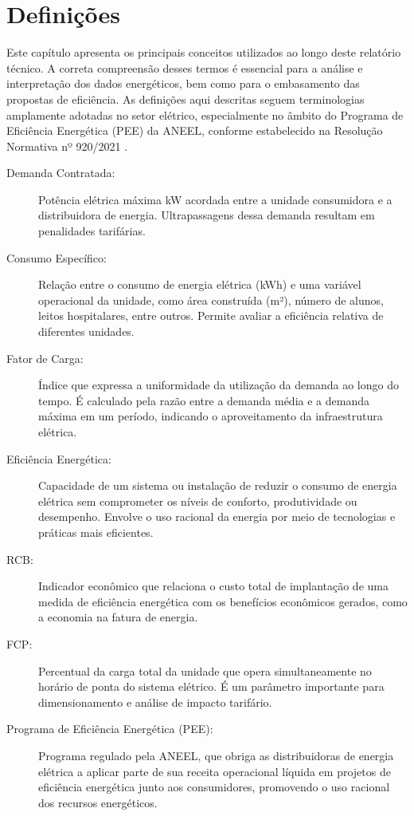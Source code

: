 \chapter{Definições}


Este capítulo apresenta os principais conceitos utilizados ao longo deste relatório técnico. A correta compreensão desses termos é essencial para a análise e interpretação dos dados energéticos, bem como para o embasamento das propostas de eficiência. As definições aqui descritas seguem terminologias amplamente adotadas no setor elétrico, especialmente no âmbito do Programa de Eficiência Energética (\ac{PEE}) da \ac{ANEEL}, conforme estabelecido na Resolução Normativa nº 920/2021 \cite{aneel920}.


\begin{description}
    \item[Demanda Contratada:] Potência elétrica máxima kW  acordada entre a unidade consumidora e a distribuidora de energia. Ultrapassagens dessa demanda resultam em penalidades tarifárias.
    
    \item[Consumo Específico:] Relação entre o consumo de energia elétrica (kWh) e uma variável operacional da unidade, como área construída (m²), número de alunos, leitos hospitalares, entre outros. Permite avaliar a eficiência relativa de diferentes unidades.
    
    \item[Fator de Carga:] Índice que expressa a uniformidade da utilização da demanda ao longo do tempo. É calculado pela razão entre a demanda média e a demanda máxima em um período, indicando o aproveitamento da infraestrutura elétrica.
    
    \item[Eficiência Energética:] Capacidade de um sistema ou instalação de reduzir o consumo de energia elétrica sem comprometer os níveis de conforto, produtividade ou desempenho. Envolve o uso racional da energia por meio de tecnologias e práticas mais eficientes.
    
    \item[\ac{RCB}:] Indicador econômico que relaciona o custo total de implantação de uma medida de eficiência energética com os benefícios econômicos gerados, como a economia na fatura de energia.
    
    \item[\ac{FCP}:] Percentual da carga total da unidade que opera simultaneamente no horário de ponta do sistema elétrico. É um parâmetro importante para dimensionamento e análise de impacto tarifário.
    
    \item[Programa de Eficiência Energética (\ac{PEE}):] Programa regulado pela \ac{ANEEL}, que obriga as distribuidoras de energia elétrica a aplicar parte de sua receita operacional líquida em projetos de eficiência energética junto aos consumidores, promovendo o uso racional dos recursos energéticos.
\end{description}
